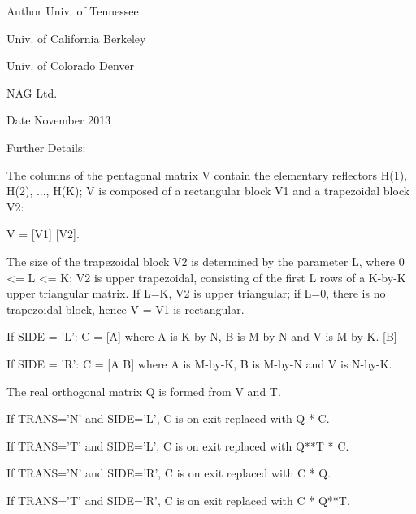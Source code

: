 \begin{DoxyAuthor}{Author}
Univ. of Tennessee 

Univ. of California Berkeley 

Univ. of Colorado Denver 

N\+A\+G Ltd. 
\end{DoxyAuthor}
\begin{DoxyDate}{Date}
November 2013 
\end{DoxyDate}
\begin{DoxyParagraph}{Further Details\+: }
\begin{DoxyVerb}  The columns of the pentagonal matrix V contain the elementary reflectors
  H(1), H(2), ..., H(K); V is composed of a rectangular block V1 and a 
  trapezoidal block V2:

        V = [V1]
            [V2].

  The size of the trapezoidal block V2 is determined by the parameter L, 
  where 0 <= L <= K; V2 is upper trapezoidal, consisting of the first L
  rows of a K-by-K upper triangular matrix.  If L=K, V2 is upper triangular;
  if L=0, there is no trapezoidal block, hence V = V1 is rectangular.

  If SIDE = 'L':  C = [A]  where A is K-by-N,  B is M-by-N and V is M-by-K. 
                      [B]   
  
  If SIDE = 'R':  C = [A B]  where A is M-by-K, B is M-by-N and V is N-by-K.

  The real orthogonal matrix Q is formed from V and T.

  If TRANS='N' and SIDE='L', C is on exit replaced with Q * C.

  If TRANS='T' and SIDE='L', C is on exit replaced with Q**T * C.

  If TRANS='N' and SIDE='R', C is on exit replaced with C * Q.

  If TRANS='T' and SIDE='R', C is on exit replaced with C * Q**T.\end{DoxyVerb}
 
\end{DoxyParagraph}
